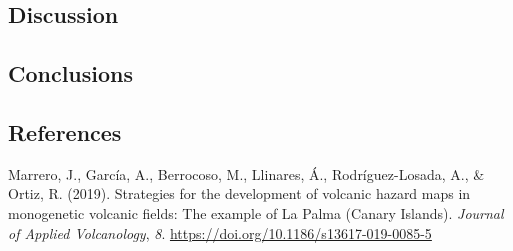 \documentclass[
]{agujournal2019}
\newlength{\cslhangindent}
\newenvironment{CSLReferences}[2] %
 {\begin{list}{}{%
  \setlength{\itemindent}{0pt}
  \setlength{\leftmargin}{0pt}
  \setlength{\parsep}{0pt}
  \ifodd #1
   \setlength{\leftmargin}{\cslhangindent}
   \setlength{\itemindent}{-1\cslhangindent}
  \fi
  \setlength{\itemsep}{#2\baselineskip}}}
 {\end{list}}
\begin{document}
\subsection{Discussion}\label{sec-discussion}

\subsection{Conclusions}\label{sec-conclusions}

\subsection*{References}\label{references}

\label{refs}
\begin{CSLReferences}{1}{0}
\vspace{1em}

Marrero, J., García, A., Berrocoso, M., Llinares, Á., Rodríguez-Losada,
A., \& Ortiz, R. (2019). Strategies for the development of volcanic
hazard maps in monogenetic volcanic fields: The example of {La} {Palma}
({Canary} {Islands}). \emph{Journal of Applied Volcanology}, \emph{8}.
\url{https://doi.org/10.1186/s13617-019-0085-5}

\end{CSLReferences}
\end{document}
